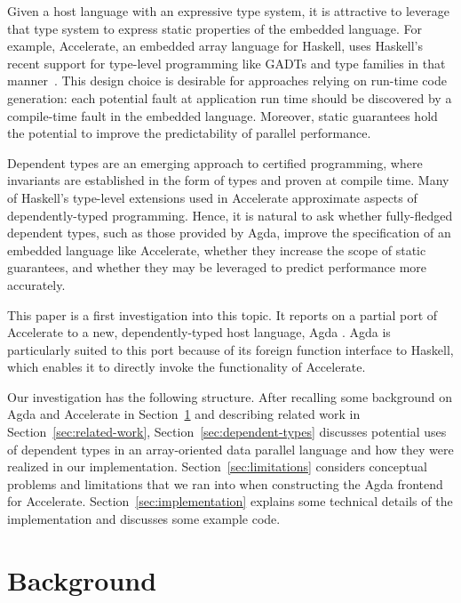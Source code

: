 \documentclass{llncs}
\begin{document}
Given a host language with an expressive type system, it is
attractive to leverage that type system to express static properties
of the embedded language. For example, Accelerate, an embedded array
language for Haskell, uses Haskell's recent support for type-level
programming like GADTs and type families in that
manner~\cite{ChakravartyKellerLeeMcdonellGrover2011}. This design
choice is desirable for approaches relying on run-time code
generation:
each  potential fault at application run time should be discovered by
a compile-time fault in the embedded language. Moreover, static guarantees
hold the potential to improve the predictability of parallel
performance. 

Dependent types are an emerging approach to certified programming, where invariants are established in the form of types and proven at compile time. Many of Haskell's type-level extensions used in Accelerate approximate aspects of dependently-typed programming. Hence, it is natural to ask whether fully-fledged dependent types, such as those provided by Agda, improve the specification of an embedded language like Accelerate, whether they increase the scope of static guarantees, and whether they may be leveraged to predict performance more accurately.

This paper is a first investigation into this topic. It reports on a
partial port of Accelerate to a new, dependently-typed host language,
Agda \cite{Norell2008,BoveDybjerNorell2009}. Agda is particularly
suited to this port because of its foreign function interface to
Haskell, which enables it to directly invoke the functionality of
Accelerate. 

Our investigation has the following structure. After recalling some
background on Agda and Accelerate in Section~\ref{sec:background} and
describing related work in Section~\ref{sec:related-work}, 
Section~\ref{sec:dependent-types} discusses potential uses of
dependent types in an array-oriented data parallel language and how they were realized in our
implementation. Section~\ref{sec:limitations} considers conceptual 
problems and limitations that we ran into when constructing the Agda
frontend for Accelerate. Section~\ref{sec:implementation} explains
some technical details of the implementation and discusses some
example code. 

\section{Background}
\label{sec:background}
\end{document}
